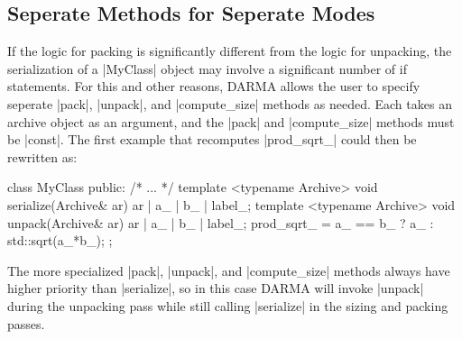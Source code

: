 \subsection{Seperate Methods for Seperate Modes}
If the logic for packing is significantly different from the logic for unpacking,
the serialization of a |MyClass| object may involve a significant
number of if statements. For this and other reasons, \gls{DARMA} allows the user to specify
seperate |pack|, |unpack|, and |compute_size| methods as needed.  Each takes an
\gls{archive} object as an argument, and the |pack| and |compute_size| methods must
be |const|.  The first example that recomputes |prod_sqrt_| could then be
rewritten as:
\begin{CppCodeNumb}
class MyClass {
  public:
    /* ... */
    template <typename Archive>
    void serialize(Archive& ar) {
      ar | a_ | b_ | label_;
    }
    template <typename Archive>
    void unpack(Archive& ar) {
      ar | a_ | b_ | label_;
      prod_sqrt_ = a_ == b_ ? a_ : std::sqrt(a_*b_);
    }
};
\end{CppCodeNumb}
The more specialized |pack|, |unpack|, and |compute_size| methods always have
higher priority than |serialize|, so in this case \gls{DARMA} will invoke |unpack|
during the unpacking pass while still calling |serialize| in the sizing and
packing passes.

